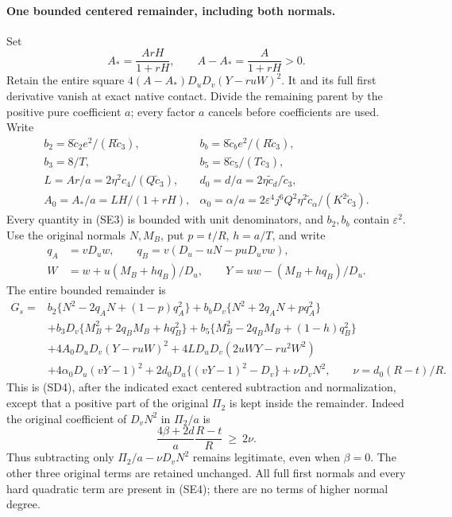 \paragraph{One bounded centered remainder, including both normals.}
Set
\[
 A_* =\frac{ArH}{1+rH},\qquad
 A-A_* =\frac{A}{1+rH}>0.                              \tag{SE2}
\]
Retain the entire square $4(A-A_*)D_uD_v(Y-r uW)^2$.
It and its full first derivative vanish at exact native contact.
Divide the remaining parent by the positive pure coefficient $a$;
every factor $a$ cancels before coefficients are used. Write
\[
 \begin{array}{ll}
 b_2=8\widetilde c_2e^2/(R\widetilde c_3),&
 b_b=8\widetilde c_be^2/(R\widetilde c_3),\\
 b_3=8/T,&b_5=8\widetilde c_5/(T\widetilde c_3),\\
 L=Ar/a=2\eta^2c_4/(Q\widetilde c_3),&
 d_0=d/a=2\eta\widetilde c_d/\widetilde c_3,\\
 A_0=A_*/a=LH/(1+rH),&
 \alpha_0=\alpha/a=2\varepsilon^4j^6Q^2\eta^2
       \widetilde c_\alpha/(K^2\widetilde c_3).
 \end{array}                                                     \tag{SE3}
\]
Every quantity in (SE3) is bounded with unit denominators, and
$b_2,b_b$ contain $\varepsilon^2$.
Use the original normals $N,M_B$, put $p=t/R$, $h=a/T$, and write
\begin{align*}
 q_A&=vD_uw,\qquad q_B=v(D_u-uN-puD_uv w),\\
 W&=w+u(M_B+hq_B)/D_u,\qquad Y=uw-(M_B+hq_B)/D_u.
\end{align*}
The entire bounded remainder is
\begin{align*}
G_s={}&b_2\{N^2-2q_AN+(1-p)q_A^2\}
 +b_bD_v\{N^2+2q_AN+pq_A^2\}\\
 &+b_3D_v\{M_B^2+2q_BM_B+hq_B^2\}
 +b_5\{M_B^2-2q_BM_B+(1-h)q_B^2\}\\
 &+4A_0D_uD_v(Y-r uW)^2
 +4LD_uD_v(2uWY-r u^2W^2)\\
 &+4\alpha_0D_u(vY-1)^2
 +2d_0D_u\{(vY-1)^2-D_v\}
 +\nu D_vN^2,\qquad \nu=d_0(R-t)/R.                 \tag{SE4}
\end{align*}
This is (SD4), after the indicated exact centered subtraction and
normalization, except that a positive part of the original $\Pi_2$ is
kept inside the remainder. Indeed the original coefficient of
$D_vN^2$ in $\Pi_2/a$ is
\[
 \frac{4\beta+2d}{a}\frac{R-t}{R}\ \ge\ 2\nu.
\]
Thus subtracting only $\Pi_2/a-\nu D_vN^2$ remains legitimate, even
when $\beta=0$. The other three original terms are retained unchanged.
All full first normals and every hard quadratic term are present in
(SE4); there are no terms of higher normal degree.

